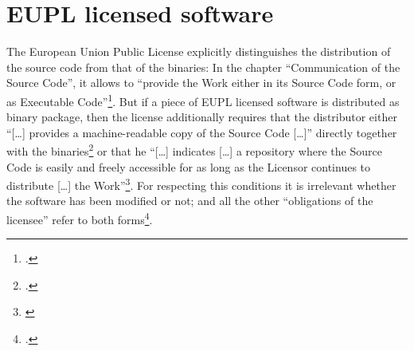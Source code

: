 %
%
%
%
%



\section{EUPL licensed software}

The European Union Public License explicitly distinguishes the distribution
of the source code from that of the binaries: In the chapter
\enquote{Communication of the Source Code}, it allows to \enquote{provide the
Work either in its Source Code form, or as Executable
Code}\footcite[cf.][\nopage wp.\ §3]{EuplLicense2007en}. But if a piece of EUPL
licensed software is distributed as binary package, then the license
additionally requires that the distributor either \enquote{[\ldots] provides a
machine-readable copy of the Source Code [\ldots]} directly together with the
binaries\footcite[cf.][\nopage wp.\ §5]{EuplLicense2007en} or that he
\enquote{[\ldots] indicates [\ldots] a repository where the Source Code is
easily and freely accessible for as long as the Licensor continues to distribute
[\ldots] the Work}\footnote{\cite[cf.][\nopage wp.\ §3.]{EuplLicense2007en}}. For
respecting this conditions it is irrelevant whether the software has been
modified or not; and all the other \enquote{obligations of the licensee} refer
to both forms\footcite[cf.][\nopage wp.\ §5]{EuplLicense2007en}. 

